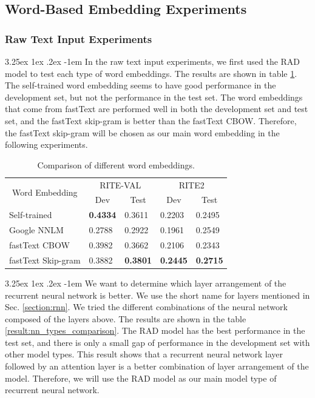 \documentclass[12pt]{article}
\makeatletter
\renewcommand\paragraph{\@startsection{paragraph}{5}{\z@}%
  {3.25ex \@plus1ex \@minus.2ex}%
  {-1em}%
  {\normalfont\normalsize\bfseries}}
\makeatother
\begin{document}
\begin{CJK*}{UTF8}{bkai}
\begin{spacing}{1.77}
\subsection{Word-Based Embedding Experiments}
\subsubsection{Raw Text Input Experiments}
\paragraph{}
In the raw text input experiments, we first used the RAD model to test each type of word embeddings. The results are shown in table \ref{result:nnlm_comparison}. The self-trained word embedding seems to have good performance in the development set, but not the performance in the test set. The word embeddings that come from fastText are performed well in both the development set and test set, and the fastText skip-gram is better than the fastText CBOW. Therefore, the fastText skip-gram will be chosen as our main word embedding in the following experiments.

\begin{table}[H]
  \centering
  \setlength{\extrarowheight}{-3pt}
  \begin{tabular}{|l|l|l|l|l|}
  \hline
  \multicolumn{1}{|c|}{\multirow{2}{*}{Word   Embedding}} & \multicolumn{2}{c|}{RITE-VAL} & \multicolumn{2}{c|}{RITE2} \\ \cline{2-5}
  \multicolumn{1}{|c|}{} & \multicolumn{1}{c|}{Dev} & \multicolumn{1}{c|}{Test} & \multicolumn{1}{c|}{Dev} & \multicolumn{1}{c|}{Test} \\ \hline
  Self-trained & \textbf{0.4334} & 0.3611 & 0.2203 & 0.2495 \\ \hline
  Google NNLM & 0.2788 & 0.2922 & 0.1961 & 0.2549 \\ \hline
  fastText CBOW & 0.3982 & 0.3662 & 0.2106 & 0.2343 \\ \hline
  fastText Skip-gram & 0.3882 & \textbf{0.3801} & \textbf{0.2445} & \textbf{0.2715} \\ \hline
  \end{tabular}
  \caption{Comparison of different word embeddings.}
  \label{result:nnlm_comparison}
\end{table}

\paragraph{}
We want to determine which layer arrangement of the recurrent neural network is better. We use the short name for layers mentioned in Sec. \ref{section:rnn}. We tried the different combinations of the neural network composed of the layers above. The results are shown in the table \ref{result:nn_types_comparison}. The RAD model has the best performance in the test set, and there is only a small gap of performance in the development set with other model types. This result shows that a recurrent neural network layer followed by an attention layer is a better combination of layer arrangement of the model. Therefore, we will use the RAD model as our main model type of recurrent neural network.


\end{spacing}
\end{CJK*}
\end{document}
